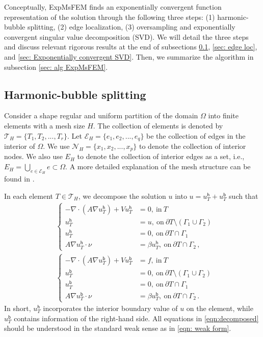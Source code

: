 \documentclass[12pt]{caltech_thesis}
\numberwithin{equation}{section}
\begin{document}
Conceptually, ExpMsFEM finds an exponentially convergent function representation of the solution through the following three steps: (1) harmonic-bubble splitting, (2) edge localization, (3) oversampling and exponentially convergent singular value decomposition (SVD). We will detail the three steps and discuss relevant rigorous results at the end of subsections \ref{sec: Harmonic-bubble splitting}, \ref{sec: edge loc}, and \ref{sec: Exponentially convergent SVD}. Then, we summarize the algorithm in subsection \ref{sec: alg ExpMsFEM}.
\subsection{Harmonic-bubble splitting}
\label{sec: Harmonic-bubble splitting}
Consider a shape regular and uniform partition of the domain $ \Omega $ into finite elements with a mesh size $H$. The collection of elements is denoted by $\mathcal{T}_H=\{T_1, T_2,..., T_r\}$. Let $\mathcal{E}_H=\{e_1,e_2,...,e_q\}$ be the collection of edges in the interior of $\Omega$. We use $\mathcal{N}_H=\{x_1,x_2,...,x_p\}$ to denote the collection of interior nodes. We also use $E_H$ to denote the collection of interior edges as a set, i.e., $E_H=\bigcup_{e \in \mathcal{E}_H} e \subset \Omega$. A more detailed explanation of the mesh structure can be found in \cite{chen2021exponential,chen2023exponentially}.

In each element $T\in\mathcal{T}_H$,
we decompose the solution $u$ into $u=u_{T}^{\mathsf{h}}+u_T^{\mathsf{b}}$ such that
\begin{equation}
\label{eqn:decomposed}
\begin{aligned}
    &\left\{
    \begin{aligned}
    -\nabla \cdot (A \nabla u_T^\mathsf{h} )+V u^\mathsf{h}_T&=0, \ \text{in} \  T\\
    u_T^\mathsf{h}&=u, \ \text{on} \  \partial T \setminus (\Gamma_1\cup\Gamma_2)\\
    u_T^\mathsf{h}&=0, \ \text{on} \  \partial T \cap \Gamma_1\\
    A\nabla u_T^\mathsf{h}\cdot\nu&=\beta u_T^\mathsf{h},\  \text{on} \ \partial T \cap \Gamma_2\, ,
    \end{aligned}
    \right.
    \\
    &\left\{
    \begin{aligned}
    -\nabla \cdot (A \nabla u^\mathsf{b}_T )+V u^\mathsf{b}_T&=f,\  \text{in} \  T\\
    u^\mathsf{b}_T&=0, \ \text{on} \  \partial T\setminus (\Gamma_1\cup\Gamma_2)\\
    u^\mathsf{b}_T&=0, \ \text{on} \  \partial T\cap \Gamma_1\\
   A\nabla u^\mathsf{b}_T\cdot\nu&=
  \beta u^\mathsf{b}_T, \ \text{on} \ \partial T \cap \Gamma_2 \, .
    \end{aligned}
    \right.
    \end{aligned}
    \end{equation}
In short, $u^{\mathsf{h}}_T$ incorporates the interior boundary value of $u$ on the element, while $u^{\mathsf{b}}_T$ contains information of the right-hand side. All equations in \eqref{eqn:decomposed} should be understood in the standard weak sense as in \eqref{eqn: weak form}.
\end{document}
